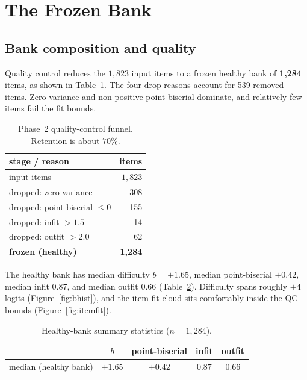 \section{The Frozen Bank}
\label{sec:results}

\subsection{Bank composition and quality}
Quality control reduces the $1{,}823$ input items to a frozen healthy
bank of \textbf{1{,}284} items, as shown in Table~\ref{tab:qc}. The four
drop reasons account for 539 removed items. Zero variance and
non-positive point-biserial dominate, and relatively few items fail the
fit bounds.

\begin{table}[htbp]
\centering
\small
\begin{tabular}{@{}lr@{}}
\toprule
stage / reason & items \\
\midrule
input items                 & $1{,}823$ \\
\quad dropped: zero-variance        & 308 \\
\quad dropped: point-biserial $\le 0$ & 155 \\
\quad dropped: infit $> 1.5$        & 14 \\
\quad dropped: outfit $> 2.0$       & 62 \\
\midrule
\textbf{frozen (healthy)}   & \textbf{1{,}284} \\
\bottomrule
\end{tabular}
\caption{Phase~2 quality-control funnel. Retention is about $70\%$.}
\label{tab:qc}
\end{table}

The healthy bank has median difficulty $b = +1.65$, median point-biserial
$+0.42$, median infit $0.87$, and median outfit $0.66$
(Table~\ref{tab:quality}). Difficulty spans roughly $\pm 4$ logits
(Figure~\ref{fig:bhist}), and the item-fit cloud sits comfortably inside
the QC bounds (Figure~\ref{fig:itemfit}).

\begin{table}[htbp]
\centering
\small
\begin{tabular}{@{}lcccc@{}}
\toprule
 & $b$ & point-biserial & infit & outfit \\
\midrule
median (healthy bank) & $+1.65$ & $+0.42$ & $0.87$ & $0.66$ \\
\bottomrule
\end{tabular}
\caption{Healthy-bank summary statistics ($n = 1{,}284$).}
\label{tab:quality}
\end{table}

